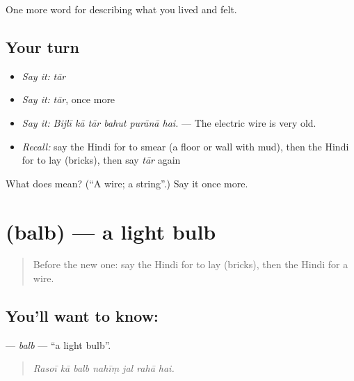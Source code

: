 \begin{grammarlens}[title={What you've built}]
One more word for describing what you lived and felt.
\end{grammarlens}

\subsection*{Your turn}
\begin{itemize}
\raggedright
  \item \emph{Say it:} \emph{tār}
  \item \emph{Say it:} \emph{tār}, once more
  \item \emph{Say it:} \emph{Bijlī kā tār bahut purānā hai.} — The electric wire is very old.
  \item \emph{Recall:} say the Hindi for to smear (a floor or wall with mud), then the Hindi for to lay (bricks), then say \emph{tār} again
\end{itemize}

\begin{tcolorbox}[breakable,colback=teal!4,colframe=teal!35!black,title={Before you move on}]
What does  mean? (\textquotedblleft{}A wire; a string\textquotedblright{}.) Say it once more.
\end{tcolorbox}
\section[\texorpdfstring{\hi{बल्ब} (balb)}{बल्ब (balb)}]{ (balb) — a light bulb}

\label{lesson:HI-C518-balb}



\begin{quote}
Before the new one: say the Hindi for to lay (bricks), then the Hindi for a wire.
\end{quote}

\subsection*{You'll want to know: }
\textbf{} — \emph{balb} — \textquotedblleft{}a light bulb\textquotedblright{}.

\begin{quote}
      
\end{quote}

\begin{quote}
\emph{Rasoī kā balb nahīṃ jal rahā hai.}
\end{quote}


